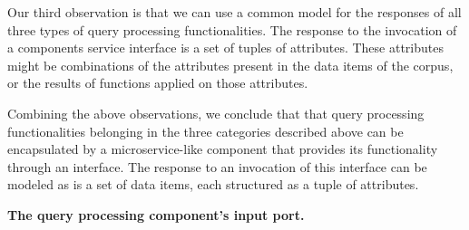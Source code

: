 Our third observation is that we can use a common model for the responses of all three types of query processing functionalities.
The response to the invocation of a components service interface is a set of tuples of attributes.
These attributes might be combinations of the attributes present in the data items of the corpus,
or the results of functions applied on those attributes.

\medskip
\noindent
Combining the above observations,
we conclude that that query processing functionalities belonging in the three categories described above
can be encapsulated by a microservice-like component that provides its functionality through an interface.
The response to an invocation of this interface can be modeled as is a set of data items, each structured as a tuple of attributes.


\vspace{12pt}
\noindent
\textbf{The query processing component's input port.}

